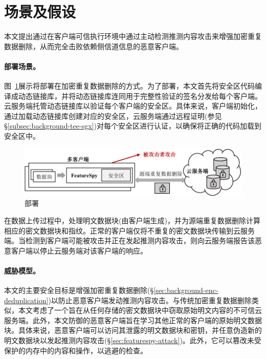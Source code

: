 \section{场景及假设}
\label{sec:featurespy-setting}

本文提出\sysnameF 通过在客户端可信执行环境中通过主动检测推测内容攻击来增强加密重复数据删除，从而完全击败依赖侧信道信息的恶意客户端。

\paragraph*{部署场景。}图~\ref{fig:featurespy-model}展示将\sysnameF 部署在加密重复数据删除的方式。为了部署\sysnameF，本文首先将安全区代码编译成动态链接库，并将动态链接库连同用于完整性验证的签名分发给每个客户端。云服务端托管动态链接库以验证每个客户端的安全区。具体来说，客户端初始化\sysnameF，通过加载动态链接库创建对应的安全区，云服务端通过远程证明(参见\S\ref{subsec:background-tee-sgx})对每个安全区进行认证，以确保将正确的代码加载到安全区中。

\begin{figure}[!htb]
    \centering
    \includegraphics[width=\textwidth]{pic/featurespy/deployment.pdf}
    \caption{部署\sysnameF}
    \label{fig:featurespy-model}
\end{figure}

在数据上传过程中，\sysnameF 处理明文数据块(由客户端生成)，并为源端重复数据删除计算相应的密文数据块和指纹。正常的客户端仅将不重复的密文数据块传输到云服务端。当\sysnameF 检测到客户端可能被攻击并正在发起推测内容攻击，则向云服务端报告该恶意客户端以停止云服务端对该客户端的响应。

\paragraph*{威胁模型。}本文的主要安全目标是增强加密重复数据删除(\S\ref{sec:background-enc-deduplication})以防止恶意客户端发动推测内容攻击。与传统加密重复数据删除类似，本文考虑了一个旨在从任何存储的密文数据块中窃取原始明文内容的不可信云服务端。此外，本文防御的恶意客户端旨在学习其他正常的客户端的原始明文数据块。具体来说，恶意客户端可以访问其泄露的明文数据块和密钥，并任意伪造新的明文数据块以发起推测内容攻击(\S\ref{sec:featurespy-attack})。此外，它可以篡改未受保护的内存中的内容和操作，以逃避\sysnameF 的检查。


